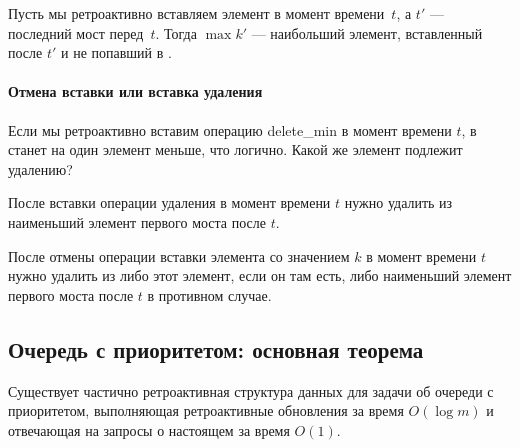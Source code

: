 \begin{stat}
	Пусть мы ретроактивно вставляем элемент в момент времени~$t$, а $t'$ — последний мост перед~$t$. Тогда $\max k'$ — наибольший элемент, вставленный после $t'$ и не попавший в \qnow.
\end{stat} \vspace{-4mm}

\paragraph{Отмена вставки или вставка удаления} Если мы ретроактивно вставим операцию delete\_min в момент времени $t$, в \qnow станет на один элемент меньше, что логично. Какой же элемент подлежит удалению?

\begin{stat}
	После вставки операции удаления в момент времени $t$ нужно удалить из \qnow наименьший элемент первого моста после $t$.

	После отмены операции вставки элемента со значением $k$ в момент времени $t$ нужно удалить из \qnow либо этот элемент, если он там есть, либо наименьший элемент первого моста после $t$ в противном случае.
\end{stat}

\subsection{Очередь с приоритетом: основная теорема}

\begin{theorem} 
	Существует частично ретроактивная структура данных для задачи об очереди с приоритетом, выполняющая ретроактивные обновления за время $O(\log m)$ и отвечающая на запросы о настоящем за время $O(1)$.
\end{theorem}
